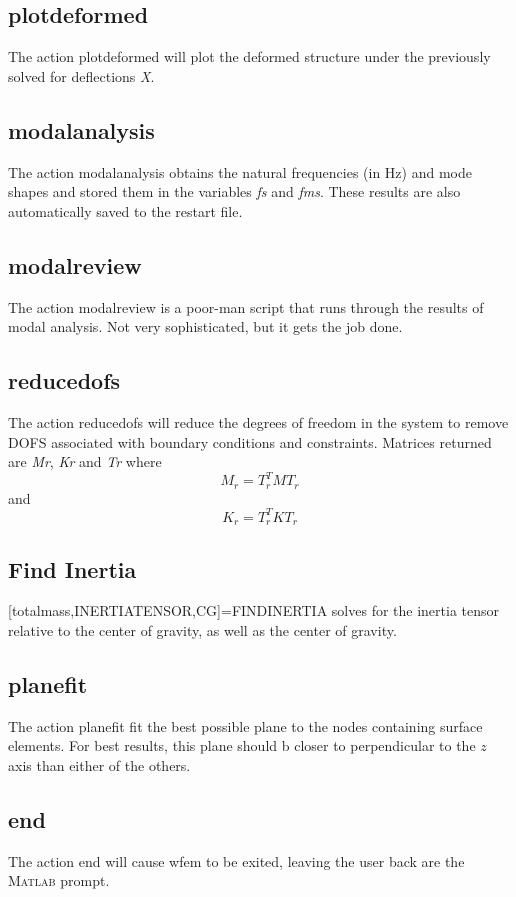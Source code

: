 \documentclass[12pt]{article}
\newcommand*{\command}[1]{\textsf{#1}}
\newcommand*{\variable}[1]{\textit{#1}}
\begin{document}
\subsection{plotdeformed}
The action \command{plotdeformed} will plot the deformed structure under the previously solved for deflections \variable{X}. 
\subsection{modalanalysis}
The action \command{modalanalysis} obtains the natural frequencies (in Hz) and mode shapes and stored them in the variables \variable{fs} and \variable{fms}. These results are also automatically saved to the restart file.
\subsection{modalreview}
The action \command{modalreview} is a poor-man script that runs through the results of modal analysis. Not very sophisticated, but it gets the job done.
\subsection{reducedofs}
The action \command{reducedofs} will reduce the degrees of freedom in the system to remove DOFS associated with boundary conditions and constraints. Matrices returned are \variable{Mr}, \variable{Kr} and \variable{Tr} where
\begin{equation}
M_r=T_r^T M T_r
\end{equation}
\noindent and
\begin{equation}
K_r=T_r^T K T_r
\end{equation}
\subsection{Find Inertia}
[totalmass,INERTIATENSOR,CG]=FINDINERTIA solves for the inertia tensor
  relative to the center of gravity, as well as the center of gravity.

\subsection{planefit}
The action \command{planefit} fit the best possible plane to the nodes containing surface elements. For best results, this plane should b closer to perpendicular to the $z$ axis than either of the others.
\subsection{end}
The action \command{end} will cause wfem to be exited, leaving the user back are the M\textsc{atlab} prompt. 
\end{document}

